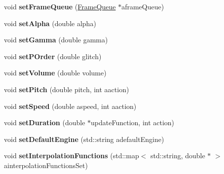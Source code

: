 \begin{DoxyCompactItemize}
\item 
\hypertarget{class_m_a_g_e_1_1_mage_a150ae12ed4e3ffc3a62abaf5fdfd9e3d}{void {\bfseries set\-Frame\-Queue} (\hyperlink{class_m_a_g_e_1_1_frame_queue}{Frame\-Queue} $\ast$aframe\-Queue)}\label{class_m_a_g_e_1_1_mage_a150ae12ed4e3ffc3a62abaf5fdfd9e3d}

\item 
\hypertarget{class_m_a_g_e_1_1_mage_aa5bcce5e56cc246c7dce73d287d59c9d}{void {\bfseries set\-Alpha} (double alpha)}\label{class_m_a_g_e_1_1_mage_aa5bcce5e56cc246c7dce73d287d59c9d}

\item 
\hypertarget{class_m_a_g_e_1_1_mage_aa619158500973cb5cb30b5017cf4624f}{void {\bfseries set\-Gamma} (double gamma)}\label{class_m_a_g_e_1_1_mage_aa619158500973cb5cb30b5017cf4624f}

\item 
\hypertarget{class_m_a_g_e_1_1_mage_a55ed47d0fcf247afc9dd3d613782ac66}{void {\bfseries set\-P\-Order} (double glitch)}\label{class_m_a_g_e_1_1_mage_a55ed47d0fcf247afc9dd3d613782ac66}

\item 
\hypertarget{class_m_a_g_e_1_1_mage_a1e87dd6829eeb4e5d0877e846b1e7329}{void {\bfseries set\-Volume} (double volume)}\label{class_m_a_g_e_1_1_mage_a1e87dd6829eeb4e5d0877e846b1e7329}

\item 
\hypertarget{class_m_a_g_e_1_1_mage_ae3dd0c90ccb3a22f0bf87347177b4ad3}{void {\bfseries set\-Pitch} (double pitch, int aaction)}\label{class_m_a_g_e_1_1_mage_ae3dd0c90ccb3a22f0bf87347177b4ad3}

\item 
\hypertarget{class_m_a_g_e_1_1_mage_a4002ab5e2dd124e10f8a46713f43bf15}{void {\bfseries set\-Speed} (double aspeed, int aaction)}\label{class_m_a_g_e_1_1_mage_a4002ab5e2dd124e10f8a46713f43bf15}

\item 
\hypertarget{class_m_a_g_e_1_1_mage_aafa5e062b14d856d4ad845dcab706005}{void {\bfseries set\-Duration} (double $\ast$update\-Function, int action)}\label{class_m_a_g_e_1_1_mage_aafa5e062b14d856d4ad845dcab706005}

\item 
\hypertarget{class_m_a_g_e_1_1_mage_ab2cc4ec66c1c570fd70313384406e742}{void {\bfseries set\-Default\-Engine} (std\-::string adefault\-Engine)}\label{class_m_a_g_e_1_1_mage_ab2cc4ec66c1c570fd70313384406e742}

\item 
\hypertarget{class_m_a_g_e_1_1_mage_adef698d2640dc3c76c6faa7c0c9853a9}{void {\bfseries set\-Interpolation\-Functions} (std\-::map$<$ std\-::string, double $\ast$ $>$ ainterpolation\-Functions\-Set)}\label{class_m_a_g_e_1_1_mage_adef698d2640dc3c76c6faa7c0c9853a9}


\end{DoxyCompactItemize}
